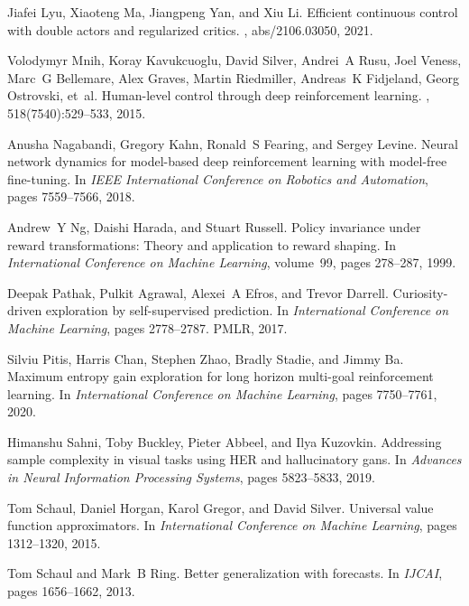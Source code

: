\documentclass{article}
\begin{document}
\begin{thebibliography}{10}
Jiafei Lyu, Xiaoteng Ma, Jiangpeng Yan, and Xiu Li.
\newblock Efficient continuous control with double actors and regularized
  critics.
, abs/2106.03050, 2021.

Volodymyr Mnih, Koray Kavukcuoglu, David Silver, Andrei~A Rusu, Joel Veness,
  Marc~G Bellemare, Alex Graves, Martin Riedmiller, Andreas~K Fidjeland, Georg
  Ostrovski, et~al.
\newblock Human-level control through deep reinforcement learning.
, 518(7540):529--533, 2015.

Anusha Nagabandi, Gregory Kahn, Ronald~S Fearing, and Sergey Levine.
\newblock Neural network dynamics for model-based deep reinforcement learning
  with model-free fine-tuning.
\newblock In {\em IEEE International Conference on Robotics and Automation},
  pages 7559--7566, 2018.

Andrew~Y Ng, Daishi Harada, and Stuart Russell.
\newblock Policy invariance under reward transformations: Theory and
  application to reward shaping.
\newblock In {\em International Conference on Machine Learning}, volume~99,
  pages 278--287, 1999.

Deepak Pathak, Pulkit Agrawal, Alexei~A Efros, and Trevor Darrell.
\newblock Curiosity-driven exploration by self-supervised prediction.
\newblock In {\em International Conference on Machine Learning}, pages
  2778--2787. PMLR, 2017.

Silviu Pitis, Harris Chan, Stephen Zhao, Bradly Stadie, and Jimmy Ba.
\newblock Maximum entropy gain exploration for long horizon multi-goal
  reinforcement learning.
\newblock In {\em International Conference on Machine Learning}, pages
  7750--7761, 2020.

Himanshu Sahni, Toby Buckley, Pieter Abbeel, and Ilya Kuzovkin.
\newblock Addressing sample complexity in visual tasks using {HER} and
  hallucinatory gans.
\newblock In {\em Advances in Neural Information Processing Systems}, pages
  5823--5833, 2019.

Tom Schaul, Daniel Horgan, Karol Gregor, and David Silver.
\newblock Universal value function approximators.
\newblock In {\em International Conference on Machine Learning}, pages
  1312--1320, 2015.

Tom Schaul and Mark~B Ring.
\newblock Better generalization with forecasts.
\newblock In {\em IJCAI}, pages 1656--1662, 2013.


\end{thebibliography}
\end{document}
